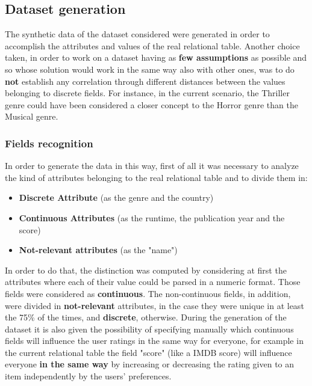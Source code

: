 \subsection{Dataset generation} \label{ch:5.2}
The synthetic data of the dataset considered were generated in order to accomplish the attributes and values of the real relational table. Another choice taken, in order to work on a dataset having as \textbf{few assumptions} as possible and so whose solution would work in the same way also with other ones, was to do \textbf{not} establish any correlation through different distances between the values belonging to discrete fields. For instance, in the current scenario, the Thriller genre could have been considered a closer concept to the Horror genre than the Musical genre.

\subsubsection{Fields recognition}
In order to generate the data in this way, first of all it was necessary to analyze the kind of attributes belonging to the real relational table and to divide them in:
\begin{itemize}
    \item \textbf{Discrete Attribute} (as the genre and the country)
    \item \textbf{Continuous Attributes} (as the runtime, the publication year and the score)
    \item \textbf{Not-relevant attributes} (as the "name")
\end{itemize}
In order to do that, the distinction was computed by considering at first the attributes where each of their value could be parsed in a numeric format. Those fields were considered as \textbf{continuous}. The non-continuous fields, in addition, were divided in \textbf{not-relevant} attributes, in the case they were unique in at least the 75\% of the times, and \textbf{discrete}, otherwise. During the generation of the dataset it is also given the possibility of specifying manually which continuous fields will influence the user ratings in the same way for everyone, for example in the current relational table the field "score" (like a IMDB score) will influence everyone \textbf{in the same way} by increasing or decreasing the rating given to an item independently by the users' preferences.

